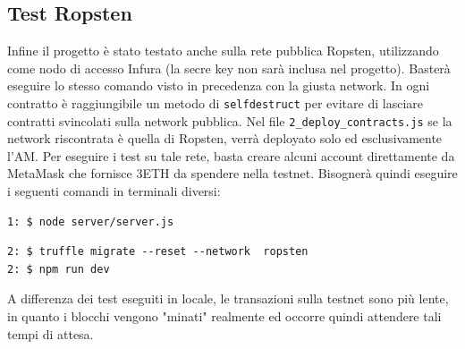 \subsection{Test Ropsten}
Infine il progetto è stato testato anche sulla rete pubblica Ropsten, utilizzando come nodo di accesso Infura (la secre key non sarà inclusa nel progetto). Basterà eseguire lo stesso comando visto in precedenza con la giusta network. In ogni contratto è raggiungibile un metodo di \texttt{selfdestruct} per evitare di lasciare contratti svincolati sulla network pubblica. Nel file \texttt{2\_deploy\_contracts.js} se la network riscontrata è quella di Ropsten, verrà deployato solo ed esclusivamente l'AM. Per eseguire i test su tale rete, basta creare alcuni account direttamente da MetaMask che fornisce 3ETH da spendere nella testnet. Bisognerà quindi eseguire i seguenti comandi in terminali diversi:
\begin{verbatim}
1: $ node server/server.js
\end{verbatim}
\begin{verbatim}
2: $ truffle migrate --reset --network  ropsten
2: $ npm run dev
\end{verbatim}
A differenza dei test eseguiti in locale, le transazioni sulla testnet sono più lente, in quanto i blocchi vengono "minati" realmente ed occorre quindi attendere tali tempi di attesa.
